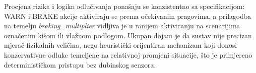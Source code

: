 Procjena rizika i logika odlučivanja ponašaju se konzistentno sa specifikacijom: WARN i BRAKE akcije aktiviraju se prema očekivanim pragovima, a prilagodba na temelju \textit{braking\_multiplier} vidljiva je u ranijem aktiviranju na scenarijima označenim kišom ili vlažnom podlogom. Ukupan dojam je da sustav nije precizan mjerač fizikalnih veličina, nego heuristički orijentiran mehanizam koji donosi konzervativne odluke temeljene na relativnoj promjeni situacije, što je primjereno determinističkom pristupu bez dubinskog senzora.